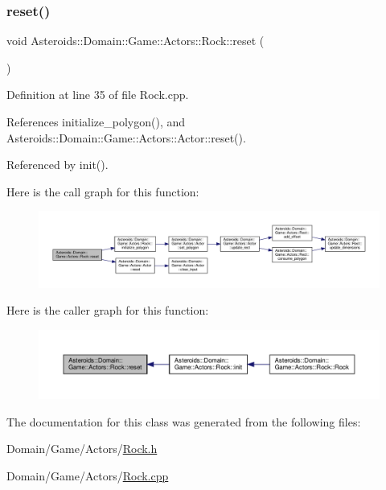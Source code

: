 \subsubsection{\texorpdfstring{reset()}{reset()}}
{\footnotesize\ttfamily void Asteroids\+::\+Domain\+::\+Game\+::\+Actors\+::\+Rock\+::reset (\begin{DoxyParamCaption}{ }\end{DoxyParamCaption})}



Definition at line 35 of file Rock.\+cpp.



References initialize\+\_\+polygon(), and Asteroids\+::\+Domain\+::\+Game\+::\+Actors\+::\+Actor\+::reset().



Referenced by init().

Here is the call graph for this function\+:\nopagebreak
\begin{figure}[H]
\begin{center}
\leavevmode
\includegraphics[width=350pt]{classAsteroids_1_1Domain_1_1Game_1_1Actors_1_1Rock_aab44647e08659d563aeb28d51868fb86_cgraph}
\end{center}
\end{figure}
Here is the caller graph for this function\+:\nopagebreak
\begin{figure}[H]
\begin{center}
\leavevmode
\includegraphics[width=350pt]{classAsteroids_1_1Domain_1_1Game_1_1Actors_1_1Rock_aab44647e08659d563aeb28d51868fb86_icgraph}
\end{center}
\end{figure}


The documentation for this class was generated from the following files\+:\begin{DoxyCompactItemize}
\item 
Domain/\+Game/\+Actors/\hyperlink{Rock_8h}{Rock.\+h}\item 
Domain/\+Game/\+Actors/\hyperlink{Rock_8cpp}{Rock.\+cpp}\end{DoxyCompactItemize}
